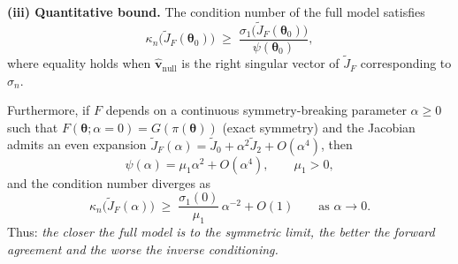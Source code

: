 \begin{theorem}
\medskip
\noindent\textbf{(iii) Quantitative bound.}
The condition number of the full model satisfies
\begin{equation}
  \kappa_n\bigl(\widetilde{J}_F(\boldsymbol{\theta}_0)\bigr)
  \;\geq\;
  \frac{\sigma_1\bigl(\widetilde{J}_F(\boldsymbol{\theta}_0)\bigr)}
  {\psi(\boldsymbol{\theta}_0)},
  \label{eq:thm4_kappa_bound}
\end{equation}
where equality holds when $\hat{\mathbf{v}}_\mathrm{null}$ is the right
singular vector of $\widetilde{J}_F$ corresponding to $\sigma_n$.

Furthermore, if $F$ depends on a continuous symmetry-breaking parameter
$\alpha\geq 0$ such that
$F(\boldsymbol{\theta};\alpha=0)=G(\pi(\boldsymbol{\theta}))$ (exact symmetry)
and the Jacobian admits an even expansion
$\widetilde{J}_F(\alpha)=\widetilde{J}_0+\alpha^2\widetilde{J}_2+O(\alpha^4)$,
then
\begin{equation}
  \psi(\alpha)=\mu_1\alpha^2+O(\alpha^4),
  \qquad \mu_1>0,
  \label{eq:thm4_psi_asymptotic}
\end{equation}
and the condition number diverges as
\begin{equation}
  \kappa_n\bigl(\widetilde{J}_F(\alpha)\bigr)
  \;\geq\;
  \frac{\sigma_1(0)}{\mu_1}\,\alpha^{-2}+O(1)
  \qquad\text{as }\alpha\to 0.
  \label{eq:thm4_kappa_divergence}
\end{equation}
Thus: \emph{the closer the full model is to the symmetric limit, the better
the forward agreement and the worse the inverse conditioning.}
\end{theorem}

